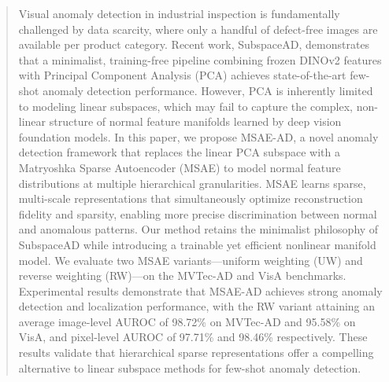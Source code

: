 \begin{abstract}
Visual anomaly detection in industrial inspection is fundamentally challenged by data scarcity, where only a handful of defect-free images are available per product category.
Recent work, SubspaceAD, demonstrates that a minimalist, training-free pipeline combining frozen DINOv2 features with Principal Component Analysis (PCA) achieves state-of-the-art few-shot anomaly detection performance.
However, PCA is inherently limited to modeling linear subspaces, which may fail to capture the complex, non-linear structure of normal feature manifolds learned by deep vision foundation models.
In this paper, we propose MSAE-AD, a novel anomaly detection framework that replaces the linear PCA subspace with a Matryoshka Sparse Autoencoder (MSAE) to model normal feature distributions at multiple hierarchical granularities.
MSAE learns sparse, multi-scale representations that simultaneously optimize reconstruction fidelity and sparsity, enabling more precise discrimination between normal and anomalous patterns.
Our method retains the minimalist philosophy of SubspaceAD while introducing a trainable yet efficient nonlinear manifold model.
We evaluate two MSAE variants---uniform weighting (UW) and reverse weighting (RW)---on the MVTec-AD and VisA benchmarks.
Experimental results demonstrate that MSAE-AD achieves strong anomaly detection and localization performance, with the RW variant attaining an average image-level AUROC of 98.72\% on MVTec-AD and 95.58\% on VisA, and pixel-level AUROC of 97.71\% and 98.46\% respectively.
These results validate that hierarchical sparse representations offer a compelling alternative to linear subspace methods for few-shot anomaly detection.
\end{abstract}
